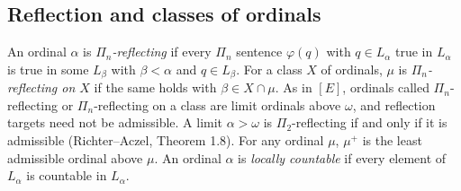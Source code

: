 \documentclass[11pt]{article}
\begin{document}
\subsection{Reflection and classes of ordinals}

An ordinal $\alpha$ is \emph{$\Pi_n$-reflecting} if every $\Pi_n$ sentence $\varphi(q)$ with $q \in L_\alpha$ true in
$L_\alpha$ is true in some $L_\beta$ with $\beta < \alpha$ and $q \in L_\beta$. For a class $X$ of ordinals, $\mu$ is
\emph{$\Pi_n$-reflecting on $X$} if the same holds with $\beta \in X \cap \mu$. As in $[E]$, ordinals called
$\Pi_n$-reflecting or $\Pi_n$-reflecting on a class are limit ordinals above $\omega$, and reflection targets need not
be admissible. A limit $\alpha > \omega$ is $\Pi_2$-reflecting if and only if it is admissible (Richter--Aczel, Theorem
1.8). For any ordinal $\mu$, $\mu^+$ is the least admissible ordinal above $\mu$. An ordinal $\alpha$ is \emph{locally
countable} if every element of $L_\alpha$ is countable in $L_\alpha$.
\end{document}
